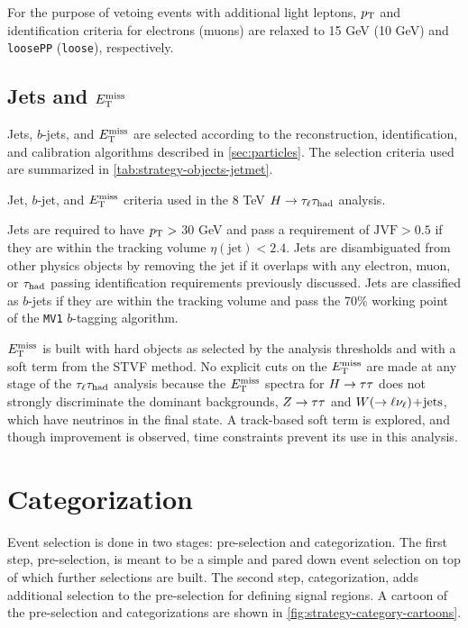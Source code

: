For the purpose of vetoing events with additional light leptons, $p_{\mathrm{T}}$ and identification criteria for electrons (muons) are relaxed to 15 GeV (10 GeV) and \texttt{loosePP} (\texttt{loose}), respectively.

\subsection{Jets and $E_{\mathrm{T}}^{\mathrm{miss}}$}
\label{sec:strategy-hadronic}

Jets, $b$-jets, and $E_{\mathrm{T}}^{\mathrm{miss}}$ are selected according to the reconstruction, identification, and calibration algorithms described in \cref{sec:particles}. The selection criteria used are summarized in \cref{tab:strategy-objects-jetmet}.

\begin{table}[bp]
  \centering
  \renewcommand{\arraystretch}{1.4}
  \caption{Jet, $b$-jet, and $E_{\mathrm{T}}^{\mathrm{miss}}$ criteria used in the 8 TeV $H\rightarrow\tau_\ell\tau_\text{had}$ analysis.}
  
  \label{tab:strategy-objects-jetmet}
\end{table}

Jets are required to have $p_{\mathrm{T}} >$ 30 GeV and pass a requirement of $\text{JVF} > 0.5$ if they are within the tracking volume $\eta(\text{jet}) < 2.4$. Jets are disambiguated from other physics objects by removing the jet if it overlaps with any electron, muon, or $\tau_\text{had}$ passing identification requirements previously discussed. Jets are classified as $b$-jets if they are within the tracking volume and pass the 70\% working point of the \texttt{MV1} $b$-tagging algorithm.

$E_{\mathrm{T}}^{\mathrm{miss}}$ is built with hard objects as selected by the analysis thresholds and with a soft term from the STVF method. No explicit cuts on the $E_{\mathrm{T}}^{\mathrm{miss}}$ are made at any stage of the $\tau_\ell\tau_\text{had}$ analysis because the $E_{\mathrm{T}}^{\mathrm{miss}}$ spectra for $H\rightarrow\tau\tau$ does not strongly discriminate the dominant backgrounds, $Z\rightarrow\tau\tau$ and $W (\rightarrow \ell\nu_\ell)\!+\!\text{jets}$, which have neutrinos in the final state. A track-based soft term is explored, and though improvement is observed, time constraints prevent its use in this analysis.

\section{Categorization}
\label{sec:strategy-categorization}

Event selection is done in two stages: pre-selection and categorization. The first step, pre-selection, is meant to be a simple and pared down event selection on top of which further selections are built. The second step, categorization, adds additional selection to the pre-selection for defining signal regions. A cartoon of the pre-selection and categorizations are shown in \cref{fig:strategy-category-cartoons}.

